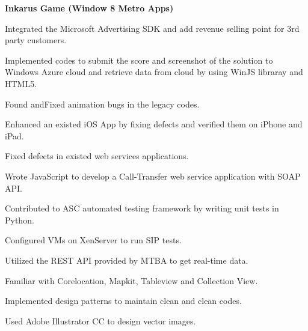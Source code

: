 \documentclass[a4paper]{lyu-resume} %
\begin{document}
\begin{minipage}[t]{0.66\textwidth}
\vspace{2 mm}
\textbf{Inkarus Game (Window 8 Metro Apps)}
\begin{tightitemize}
\item Integrated the Microsoft Advertising SDK and add revenue selling point for 3rd party customers. 
\item Implemented codes to submit the score and screenshot of the solution to Windows Azure cloud and retrieve data from cloud by using WinJS libraray and HTML5.
\item Found andFixed animation bugs in the legacy codes.
\end{tightitemize}

\sectionspace %



\begin{tightitemize}
\item Enhanced an existed iOS App by fixing defects and verified them on iPhone and iPad. 
\item Fixed defects in existed web services applications.
\item Wrote JavaScript to develop a Call-Transfer web service application with SOAP API.
\item Contributed to ASC automated testing framework by writing unit tests in Python.
\item Configured VMs on XenServer to run SIP tests.
\end{tightitemize}


\begin{tightitemize}
\item Utilized the REST API provided by MTBA to get real-time data.
\item Familiar with Corelocation, Mapkit, Tableview and Collection View.
\item Implemented design patterns to maintain clean and clean codes.
\item Used Adobe Illustrator CC to design vector images.
\end{tightitemize}



\end{minipage}
\end{document}

